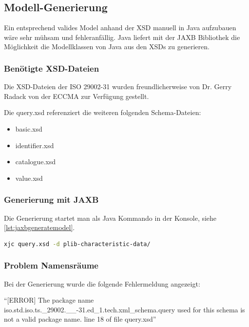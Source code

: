 \subsection{Modell-Generierung}\label{sec:modellgenerierung}

Ein entsprechend valides Model anhand der XSD manuell in Java aufzubauen wäre sehr mühsam und fehleranfällig. Java liefert mit der \gls{JAXB} Bibliothek die Möglichkeit die Modellklassen von Java aus den XSDs zu generieren.

\subsubsection{Benötigte XSD-Dateien}

Die XSD-Dateien der ISO 29002-31 wurden freundlicherweise von Dr. Gerry Radack von der \gls{ECCMA} zur Verfügung gestellt. 

Die query.xsd referenziert die weiteren folgenden Schema-Dateien:
\begin{itemize}
\item basic.xsd
\item identifier.xsd
\item catalogue.xsd
\item value.xsd
\end{itemize}

\subsubsection{Generierung mit JAXB}

Die Generierung startet man als Java Kommando in der Konsole, siehe \autoref{lst:jaxbgeneratemodel}.

\begin{lstlisting}[caption=JAXB Modellgenerierung von der Konsole, language=sh, label=lst:jaxbgeneratemodel]
xjc query.xsd -d plib-characteristic-data/ 
\end{lstlisting}

\subsubsection{Problem Namensräume}
Bei der Generierung wurde die folgende Fehlermeldung angezeigt:

\enquote{[ERROR] The package name iso.std.iso.ts.\_29002.\_\_-31.ed\_1.tech.xml\_schema.query used for this schema is not a valid package name. line 18 of file query.xsd}
  
